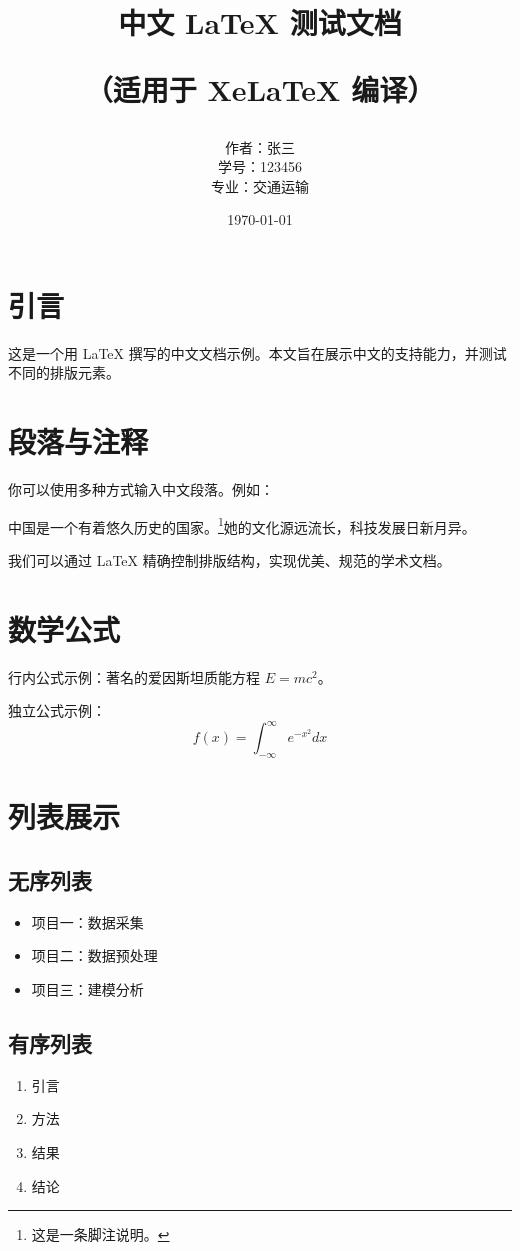 \documentclass[12pt]{article}
\title{\Huge 中文 LaTeX 测试文档\par \vspace{1em} \Large（适用于 XeLaTeX 编译）}
\author{\large 作者：张三\\ 学号：123456\\ 专业：交通运输}
\date{\today}
\begin{document}
\maketitle
\cleardoublepage

\tableofcontents
\cleardoublepage

\section{引言}
这是一个用 \LaTeX{} 撰写的中文文档示例。本文旨在展示中文的支持能力，并测试不同的排版元素。

\section{段落与注释}
你可以使用多种方式输入中文段落。例如：

中国是一个有着悠久历史的国家。\footnote{这是一条脚注说明。}她的文化源远流长，科技发展日新月异。

我们可以通过 \LaTeX{} 精确控制排版结构，实现优美、规范的学术文档。

\section{数学公式}
行内公式示例：著名的爱因斯坦质能方程 $E = mc^2$。

独立公式示例：
\[
f(x) = \int_{-\infty}^{\infty} e^{-x^2} dx
\]

\section{列表展示}
\subsection{无序列表}
\begin{itemize}
    \item 项目一：数据采集
    \item 项目二：数据预处理
    \item 项目三：建模分析
\end{itemize}

\subsection{有序列表}
\begin{enumerate}
    \item 引言
    \item 方法
    \item 结果
    \item 结论
\end{enumerate}
\end{document}
